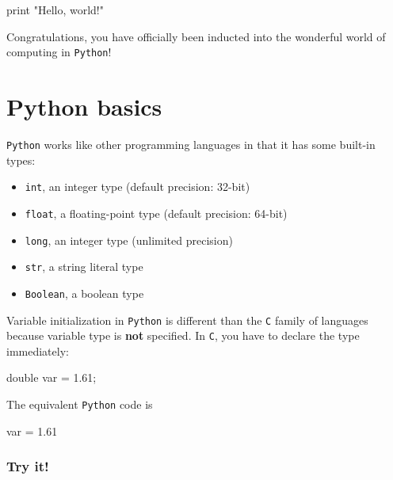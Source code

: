 \documentclass{article}
\newenvironment{Shaded}{}{}
\newcommand{\DataTypeTok}[1]{\textcolor[rgb]{0.56,0.13,0.00}{{#1}}}
\newcommand{\FloatTok}[1]{\textcolor[rgb]{0.25,0.63,0.44}{{#1}}}
\newcommand{\StringTok}[1]{\textcolor[rgb]{0.25,0.44,0.63}{{#1}}}
\newcommand{\NormalTok}[1]{{#1}}
\begin{document}
\begin{Shaded}
\begin{Highlighting}[]
\DataTypeTok{print} \StringTok{"Hello, world!"}
\end{Highlighting}
\end{Shaded}

Congratulations, you have officially been inducted into the wonderful
world of computing in \texttt{Python}!

\section{Python basics}\label{python-basics}

\texttt{Python} works like other programming languages in that it has
some built-in types:

\begin{itemize}
\itemsep1pt\parskip0pt
\item
  \texttt{int}, an integer type (default precision: 32-bit)
\item
  \texttt{float}, a floating-point type (default precision: 64-bit)
\item
  \texttt{long}, an integer type (unlimited precision)
\item
  \texttt{str}, a string literal type
\item
  \texttt{Boolean}, a boolean type
\end{itemize}

Variable initialization in \texttt{Python} is different than the
\texttt{C} family of languages because variable type is \textbf{not}
specified. In \texttt{C}, you have to declare the type immediately:

\begin{Shaded}
\begin{Highlighting}[]
\DataTypeTok{double} \NormalTok{var = }\FloatTok{1.61}\NormalTok{;}
\end{Highlighting}
\end{Shaded}

The equivalent \texttt{Python} code is

\begin{Shaded}
\begin{Highlighting}[]
\NormalTok{var = }\FloatTok{1.61}
\end{Highlighting}
\end{Shaded}

\subsubsection{Try it!}\label{try-it}
\end{document}
